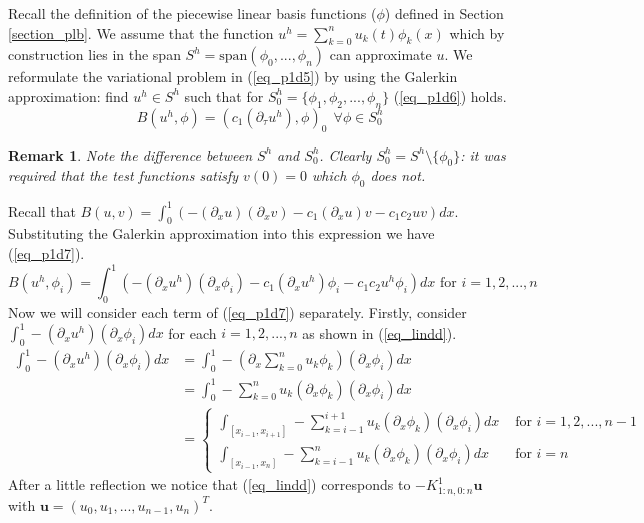 \documentclass[11pt,fleqn]{article}
\theoremstyle{defstyle}
\newtheorem{rmrk}{Remark}[section]
\begin{document}
Recall the definition of the piecewise linear basis functions ($\phi$) defined in Section \ref{section_plb}. We assume that the function $u^h =\sum^n_{k=0} u_k(t) \phi_k(x)$ which by construction lies in the span $S^h=\text{span}(\phi_0,...,\phi_n)$ can approximate $u$. We reformulate the variational problem in (\ref{eq_p1d5}) by using the Galerkin approximation: find $u^h \in S^h$ such that for $S^h_0=\{\phi_1, \phi_2,...,\phi_n \}$ (\ref{eq_p1d6}) holds.
\begin{equation}
B(u^h, \phi) = (c_1(\partial_{\tau}u^h),\phi)_0~~\forall \phi \in S^h_0
\label{eq_p1d6}
\end{equation} 
\begin{rmrk}
Note the difference between $S^h$ and $S^h_0$. Clearly $S^h_0=S^h\setminus \{\phi_0\}$: it was required that the test functions satisfy $v(0)=0$ which $\phi_0$ does not. 
\end{rmrk}
Recall that $B(u, v) = \int_0^1 (-(\partial_xu)(\partial_xv) - c_1(\partial_xu)v - c_1c_2uv)dx$. Substituting the Galerkin approximation into this expression we have (\ref{eq_p1d7}).
\begin{equation}
B(u^h, \phi_i) = \int_0^1 (-(\partial_xu^h)(\partial_x\phi_i) - c_1(\partial_xu^h)\phi_i - c_1c_2u^h\phi_i)dx \text{ for } i=1,2,...,n
\label{eq_p1d7}
\end{equation}
Now we will consider each term of (\ref{eq_p1d7}) separately. Firstly, consider $\int_0^1 -(\partial_xu^h)(\partial_x\phi_i)dx$ for each $i=1,2,...,n$ as shown in (\ref{eq_lindd}).
\begin{equation}
\begin{aligned}
\int_0^1 -(\partial_xu^h)(\partial_x\phi_i)dx &= \int_0^1 -(\partial_x \sum_{k=0}^{n} u_k\phi_k)(\partial_x\phi_i)dx \\
&= \int_0^1 -\sum_{k=0}^{n} u_k(\partial_x\phi_k)(\partial_x\phi_i)dx \\
&= \begin{cases}
\int_{[x_{i-1},x_{i+1}]}-\sum_{k=i-1}^{i+1} u_k(\partial_x\phi_k)(\partial_x\phi_i)dx &\text{ for } i=1,2,..., n-1 \\
\int_{[x_{i-1},x_{n}]}-\sum_{k=i-1}^{n} u_k(\partial_x\phi_k)(\partial_x\phi_i)dx &\text{ for } i=n
\end{cases}
\end{aligned}
\label{eq_lindd}
\end{equation}
After a little reflection we notice that (\ref{eq_lindd}) corresponds to $-K^1_{1:n, 0:n}\mathbf{u}$ with $\mathbf{u} = \left(u_0, u_1,...,u_{n-1}, u_n \right)^T$. 
\end{document}
